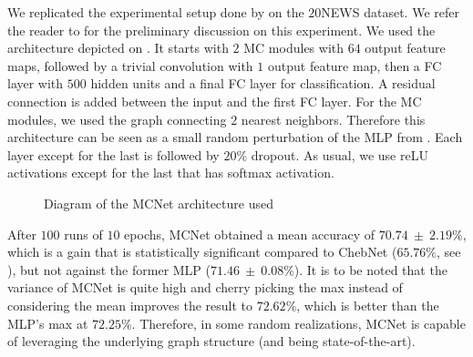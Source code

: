 We replicated the experimental setup done by \cite{defferrard2016convolutional} on the $20$NEWS dataset. We refer the reader to  for the preliminary discussion on this experiment. We used the architecture depicted on . It starts with $2$ MC modules with $64$ output feature maps, followed by a trivial convolution with $1$ output feature map, then a FC layer with $500$ hidden units and a final FC layer for classification. A residual connection is added between the input and the first FC layer. For the MC modules, we used the graph connecting $2$ nearest neighbors. Therefore this architecture can be seen as a small random perturbation of the MLP from . Each layer except for the last is followed by $20\%$ dropout. As usual, we use reLU activations except for the last that has softmax activation.

\begin{figure}[h!tbp]
\centering
{}
\caption{Diagram of the MCNet architecture used}
\label{fig:archiMC}
\end{figure}

After $100$ runs of $10$ epochs, MCNet obtained a mean accuracy of $70.74~\pm~2.19\%$, which is a gain that is statistically significant compared to ChebNet ($65.76\%$, see ), but not against the former MLP ($71.46~\pm~0.08\%$). It is to be noted that the variance of MCNet is quite high and cherry picking the max instead of considering the mean improves the result to $72.62\%$, which is better than the MLP's max at $72.25\%$. Therefore, in some random realizations, MCNet is capable of leveraging the underlying graph structure (and being state-of-the-art).


